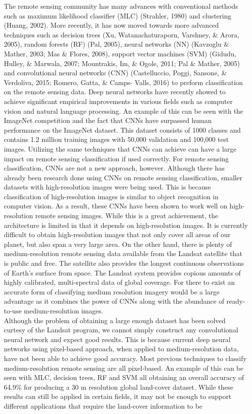 \documentclass[letterpaper, 10 pt, conference]{ieeeconf}  %
\begin{document}
The remote sensing community has many advances with conventional methods such as maximum likelihood classifier (MLC) (Strahler, 1980) and clustering (Huang, 2002). More recently, it has now moved towards more advanced techniques such as decision trees (Xu, Watanachaturaporn, Varshney, \& Arora, 2005), random forests (RF) (Pal, 2005), neural networks (NN) (Kavzoglu \& Mather, 2003; Mas \& Flores, 2008), support vector machines (SVM) (Gidudu, Hulley, \& Marwala, 2007; Mountrakis, Im, \& Ogole, 2011; Pal \& Mather, 2005) and convolutional neural networks (CNN) (Castelluccio, Poggi, Sansone, \& Verdoliva, 2015; Romero, Gatta, \& Camps- Valls, 2016) to preform classification on the remote sensing data. Deep neural networks have recently showed to achieve significant empirical improvements in various fields such as computer vision and natural language processing. An example of this can be seen with the ImageNet competition and the fact that CNNs have surpassed human performance on the ImageNet dataset. This dataset consists of 1000 classes and contains 1.2 million training images with 50,000 validation and 100,000 test images. Utilizing the same techniques that CNNs can achieve can have a large impact on remote sensing classification if used correctly. For remote sensing classification, CNNs are not a new approach, however. Although there has already been research done using CNNs on remote sensing classification, smaller datasets with high-resolution images were being used. This is because classification of high-resolution images is similar to object recognition in computer vision. As a result, these CNNs have been shown to work well on high-resolution remote sensing images. While this is a great achievement, the architecture is limited in that it depends on high-resolution images. It is currently difficult to obtain high-resolution images that not only cover all areas of our planet, but also span a very large area. On the other hand, there is plenty of medium-resolution remote sensing data available from the Landsat satellite that is public and free. The satellite also provides the longest continuous observations of Earth’s surface from space. The Landsat system provides copious amounts of highly calibrated, multi-spectral data of global coverage. For there to exist an accurate form of classifying medium resolution imagery would be a large advantage as it combines the power of CNNs along with the abundance of ready-to-use medium-resolution images. \\ \indent Although the problem of obtaining a large enough dataset has been solved curtesy of the Landsat program, we cannot simply construct any convolutional neural network and expect good results. This is because current deep neural networks using pixel-based approach, when applied to medium-resolution data, have not been able to achieve good accuracy. Most previous techniques to classify medium-resolution remote sensing are all pixel-based. An example of this can be seen with MLC, decision trees, RF and SVM all obtaining an overall accuracy of 64.9\% for producing a 30 m resolution global land-cover dataset. While these results can still be applied in certain fields, it may not be enough to support different applications that require the land-cover information to be 
\end{document}
